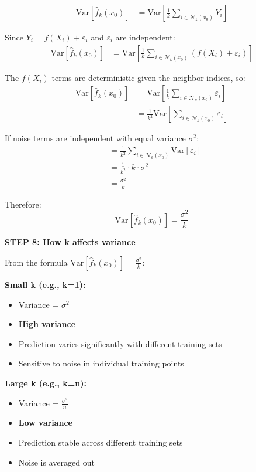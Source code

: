 \documentclass[12pt]{article}
\begin{document}
\begin{solution}
\begin{align*}
\text{Var}[\hat{f}_k(x_0)] &= \text{Var}\left[\frac{1}{k} \sum_{i \in \mathcal{N}_k(x_0)} Y_i\right]
\end{align*}

Since \(Y_i = f(X_i) + \varepsilon_i\) and \(\varepsilon_i\) are independent:
\begin{align*}
\text{Var}[\hat{f}_k(x_0)] &= \text{Var}\left[\frac{1}{k} \sum_{i \in \mathcal{N}_k(x_0)} (f(X_i) + \varepsilon_i)\right]
\end{align*}

The \(f(X_i)\) terms are deterministic given the neighbor indices, so:
\begin{align*}
\text{Var}[\hat{f}_k(x_0)] &= \text{Var}\left[\frac{1}{k} \sum_{i \in \mathcal{N}_k(x_0)} \varepsilon_i\right] \\
&= \frac{1}{k^2} \text{Var}\left[\sum_{i \in \mathcal{N}_k(x_0)} \varepsilon_i\right]
\end{align*}

If noise terms are independent with equal variance \(\sigma^2\):
\begin{align*}
&= \frac{1}{k^2} \sum_{i \in \mathcal{N}_k(x_0)} \text{Var}[\varepsilon_i] \\
&= \frac{1}{k^2} \cdot k \cdot \sigma^2 \\
&= \frac{\sigma^2}{k}
\end{align*}

Therefore:
\[
\boxed{\text{Var}[\hat{f}_k(x_0)] = \frac{\sigma^2}{k}}
\]

\textbf{STEP 8: How k affects variance}

From the formula \(\text{Var}[\hat{f}_k(x_0)] = \frac{\sigma^2}{k}\):

\textbf{Small k (e.g., k=1):}
\begin{itemize}
    \item Variance = \(\sigma^2\)
    \item \textbf{High variance}
    \item Prediction varies significantly with different training sets
    \item Sensitive to noise in individual training points
\end{itemize}

\textbf{Large k (e.g., k=n):}
\begin{itemize}
    \item Variance = \(\frac{\sigma^2}{n}\)
    \item \textbf{Low variance}
    \item Prediction stable across different training sets
    \item Noise is averaged out
\end{itemize}


\end{solution}
\end{document}
